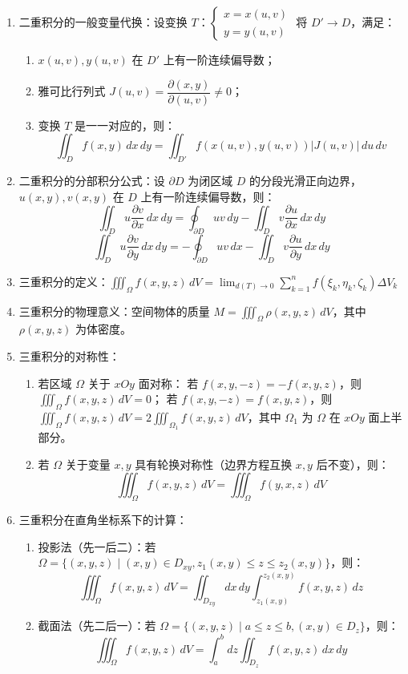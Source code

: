 \documentclass[UTF8]{ctexart}
\theoremstyle{remark}
\begin{document}
\begin{enumerate}
		\item 二重积分的一般变量代换：设变换 \(T\)：\(\begin{cases} x = x(u, v) \\ y = y(u, v) \end{cases}\) 将 \(D' \to D\)，满足：
		\begin{enumerate}
			\item \(x(u, v), y(u, v)\) 在 \(D'\) 上有一阶连续偏导数；
			\item 雅可比行列式 \(J(u, v) = \dfrac{\partial(x, y)}{\partial(u, v)} \neq 0\)；
			\item 变换 \(T\) 是一一对应的，则：
			\[
			\iint_D f(x, y) \, dx \, dy = \iint_{D'} f(x(u, v), y(u, v)) |J(u, v)| \, du \, dv
			\]
		\end{enumerate}
		
		\item 二重积分的分部积分公式：设 \(\partial D\) 为闭区域 \(D\) 的分段光滑正向边界，\(u(x, y), v(x, y)\) 在 \(D\) 上有一阶连续偏导数，则：
		\[
		\iint_D u \frac{\partial v}{\partial x} \, dx \, dy = \oint_{\partial D} uv \, dy - \iint_D v \frac{\partial u}{\partial x} \, dx \, dy
		\]
		\[
		\iint_D u \frac{\partial v}{\partial y} \, dx \, dy = -\oint_{\partial D} uv \, dx - \iint_D v \frac{\partial u}{\partial y} \, dx \, dy
		\]
		
		\item 三重积分的定义：\(\iiint_\Omega f(x, y, z) \, dV = \lim_{d(T) \to 0} \sum_{k=1}^n f(\xi_k, \eta_k, \zeta_k) \Delta V_k\)
		
		\item 三重积分的物理意义：空间物体的质量 \(M = \iiint_\Omega \rho(x, y, z) \, dV\)，其中 \(\rho(x, y, z)\) 为体密度。
		
		\item 三重积分的对称性：
		\begin{enumerate}
			\item 若区域 \(\Omega\) 关于 \(xOy\) 面对称：
若 \(f(x, y, -z) = -f(x, y, z)\)，则 \(\iiint_\Omega f(x, y, z) \, dV = 0\)；
若 \(f(x, y, -z) = f(x, y, z)\)，则 \(\iiint_\Omega f(x, y, z) \, dV = 2\iiint_{\Omega_1} f(x, y, z) \, dV\)，其中 \(\Omega_1\) 为 \(\Omega\) 在 \(xOy\) 面上半部分。
			\item 若 \(\Omega\) 关于变量 \(x, y\) 具有轮换对称性（边界方程互换 \(x, y\) 后不变），则：
			\[
			\iiint_\Omega f(x, y, z) \, dV = \iiint_\Omega f(y, x, z) \, dV
			\]
		\end{enumerate}
		
		\item 三重积分在直角坐标系下的计算：
		\begin{enumerate}
			\item 投影法（先一后二）：若 \(\Omega = \{(x, y, z) \mid (x, y) \in D_{xy}, z_1(x, y) \leq z \leq z_2(x, y)\}\)，则：
			\[
			\iiint_\Omega f(x, y, z) \, dV = \iint_{D_{xy}} dx \, dy \int_{z_1(x, y)}^{z_2(x, y)} f(x, y, z) \, dz
			\]
			\item 截面法（先二后一）：若 \(\Omega = \{(x, y, z) \mid a \leq z \leq b, (x, y) \in D_z\}\)，则：
			\[
			\iiint_\Omega f(x, y, z) \, dV = \int_a^b dz \iint_{D_z} f(x, y, z) \, dx \, dy
			\]
		\end{enumerate}
		

\end{enumerate}
\end{document}
